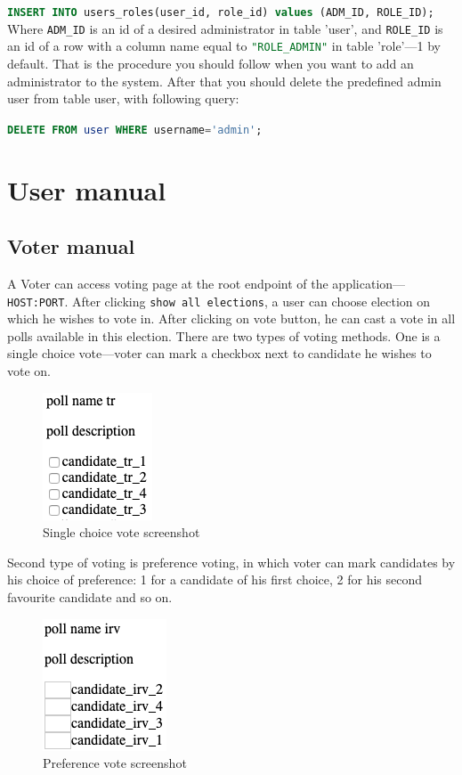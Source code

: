 \documentclass[a4paper,twoside,12pt]{book}
\begin{document}
    \lstinline[language=sql]|INSERT INTO users_roles(user_id, role_id) values (ADM_ID, ROLE_ID);|
    Where \lstinline[language=sql]|ADM_ID| is an id of a desired administrator in table 'user', and \lstinline[language=sql]|ROLE_ID| is an id of a row with a column name equal to \lstinline[language=sql]|"ROLE_ADMIN"| in table 'role'---1 by default.
    That is the procedure you should follow when you want to add an administrator to the system.
    After that you should delete the predefined admin user from table user, with following query:

    \lstinline[language=sql]|DELETE FROM user WHERE username='admin';|

  \section{User manual}
    \subsection{Voter manual}
      A Voter can access voting page at the root endpoint of the application---\mbox{\lstinline|HOST:PORT|.}
      After clicking \lstinline|show all elections|, a user can choose election on which he wishes to vote in.
      After clicking on vote button, he can cast a vote in all polls available in this election.
      \pagebreak
      There are two types of voting methods. One is a single choice vote---voter can mark a checkbox next to candidate he wishes to vote on.
      \begin{figure}[h]
        \centering
        \includegraphics[width=0.3\linewidth]{single_choice_vote_screenshot.png}
        \caption{Single choice vote screenshot}
        \label{fig:single_choice_vote_screenshot}
      \end{figure}

      Second type of voting is preference voting, in which voter can mark candidates by his choice of preference:
      1 for a candidate of his first choice, 2 for his second favourite candidate and so on.
      \begin{figure}[h]
        \centering
        \includegraphics[width=0.3\linewidth]{preference_vote_screenshot.png}
        \caption{Preference vote screenshot}
        \label{fig:preference_vote_screenshot}
      \end{figure}
\end{document}
